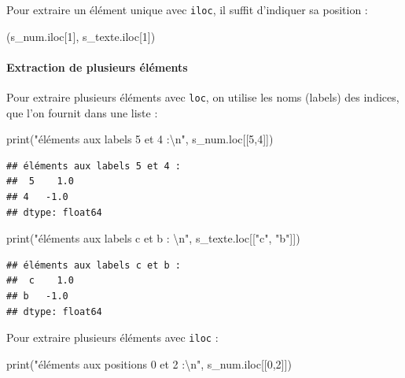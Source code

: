 \documentclass[12pt,]{book}
\newenvironment{Shaded}{\begin{snugshade}}{\end{snugshade}}
\newcommand{\DecValTok}[1]{\textcolor[rgb]{0.00,0.00,0.81}{#1}}
\newcommand{\CharTok}[1]{\textcolor[rgb]{0.31,0.60,0.02}{#1}}
\newcommand{\StringTok}[1]{\textcolor[rgb]{0.31,0.60,0.02}{#1}}
\newcommand{\BuiltInTok}[1]{#1}
\newcommand{\NormalTok}[1]{#1}
\let\oldparagraph\paragraph
\renewcommand{\paragraph}[1]{\oldparagraph{#1}\mbox{}}
\numberwithin{equation}{section}
\numberwithin{countremarque}{section}
\begin{document}
Pour extraire un élément unique avec \texttt{iloc}, il suffit d'indiquer
sa position :

\begin{Shaded}
\begin{Highlighting}[]
\NormalTok{(s_num.iloc[}\DecValTok{1}\NormalTok{], s_texte.iloc[}\DecValTok{1}\NormalTok{])}
\end{Highlighting}
\end{Shaded}

\paragraph{Extraction de plusieurs
éléments}\label{extraction-de-plusieurs-elements}

Pour extraire plusieurs éléments avec \texttt{loc}, on utilise les noms
(labels) des indices, que l'on fournit dans une liste :

\begin{Shaded}
\begin{Highlighting}[]
\BuiltInTok{print}\NormalTok{(}\StringTok{"éléments aux labels 5 et 4 :}\CharTok{\textbackslash{}n}\StringTok{"}\NormalTok{, s_num.loc[[}\DecValTok{5}\NormalTok{,}\DecValTok{4}\NormalTok{]])}
\end{Highlighting}
\end{Shaded}

\begin{lstlisting}
## éléments aux labels 5 et 4 :
##  5    1.0
## 4   -1.0
## dtype: float64
\end{lstlisting}

\begin{Shaded}
\begin{Highlighting}[]
\BuiltInTok{print}\NormalTok{(}\StringTok{"éléments aux labels c et b : }\CharTok{\textbackslash{}n}\StringTok{"}\NormalTok{, s_texte.loc[[}\StringTok{"c"}\NormalTok{, }\StringTok{"b"}\NormalTok{]])}
\end{Highlighting}
\end{Shaded}

\begin{lstlisting}
## éléments aux labels c et b : 
##  c    1.0
## b   -1.0
## dtype: float64
\end{lstlisting}

Pour extraire plusieurs éléments avec \texttt{iloc} :

\begin{Shaded}
\begin{Highlighting}[]
\BuiltInTok{print}\NormalTok{(}\StringTok{"éléments aux positions 0 et 2 :}\CharTok{\textbackslash{}n}\StringTok{"}\NormalTok{, s_num.iloc[[}\DecValTok{0}\NormalTok{,}\DecValTok{2}\NormalTok{]])}
\end{Highlighting}
\end{Shaded}
\end{document}

